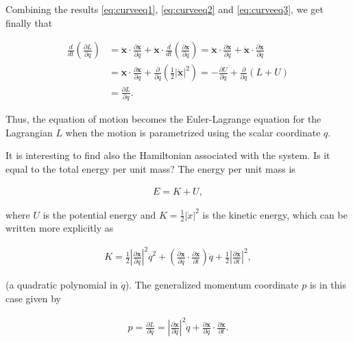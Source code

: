 \documentclass[11pt]{report}
\theoremstyle{plain}
\theoremstyle{definition}
\begin{document}
\noindent Combining the results \eqref{eq:curveeq1}, \eqref{eq:curveeq2}
and \eqref{eq:curveeq3}, we get finally that

\begin{align*}
\frac{d}{dt}\left(\frac{\partial L}{\partial \dot{q}}\right)
&=
\ddot{\mathbf{x}} \cdot \frac{\partial \mathbf{x}}{\partial q}
+ \dot{\mathbf{x}}\cdot \frac{d}{dt}\left( \frac{\partial \mathbf{x}}{\partial q}\right)
=
\ddot{\mathbf{x}} \cdot \frac{\partial \mathbf{x}}{\partial q}
+ \dot{\mathbf{x}} \cdot \frac{\partial \dot{\mathbf{x}}}{\partial q} \\
&=
\ddot{\mathbf{x}} \cdot \frac{\partial \mathbf{x}}{\partial q}
+ \frac{\partial }{\partial q}\left(\tfrac12|\dot{\mathbf{x}}|^2\right)
= -\frac{\partial U}{\partial q}+\frac{\partial }{\partial q}(L+U) \\
&= \frac{\partial L}{\partial q}.
\end{align*}

\noindent Thus, the equation of motion becomes the
Euler-Lagrange equation for the Lagrangian $L$ when
the motion is parametrized using the scalar coordinate
$q$.

It is interesting to find also the Hamiltonian
associated with the system. Is it equal to the total
energy per unit mass? The energy per unit mass is

\begin{align*}
E = K + U,
\end{align*}

\noindent where $U$ is the potential energy and
$K = \tfrac12|\dot{x}|^2$ is the kinetic energy, which
can be written more explicitly as

\begin{align*}
K = \tfrac12 \left|\frac{\partial \mathbf{x}}{\partial q}\right|^2 \dot{q}^2 + \left(\frac{\partial \mathbf{x}}{\partial q}\cdot\frac{\partial \mathbf{x}}{\partial t}\right)
\dot{q} + \tfrac12\left|\frac{\partial \mathbf{x}}{\partial t}\right|^2,
\end{align*}

\noindent (a quadratic polynomial in $\dot{q}$). The generalized
momentum coordinate $p$ is in this case given by

\begin{align*}
p = \frac{\partial L}{\partial \dot{q}} =
\left|\frac{\partial \mathbf{x}}{\partial q}\right|^2 \dot{q} + \frac{\partial \mathbf{x}}{\partial q}\cdot\frac{\partial \mathbf{x}}{\partial t}.
\end{align*}
\end{document}
